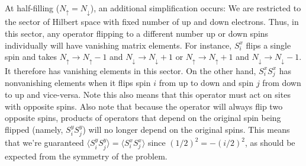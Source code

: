 \documentclass{report}
\begin{document}
At half-filling ($ N_\uparrow = N_\downarrow $), an additional 
simplification occurs: We are restricted to the sector of Hilbert space with 
fixed number of up and down electrons. Thus, in this sector, any operator
flipping to a different number up or down spins individually will have vanishing 
matrix elements. For instance, $ S_i^x $ flips a single spin and takes 
$ N_\uparrow \rightarrow N_\uparrow - 1 $ and $ N_\downarrow \rightarrow
N_\downarrow + 1 $ or $ N_\uparrow \rightarrow N_\uparrow + 1 $ and $
N_\downarrow \rightarrow N_\downarrow - 1 $. It therefore has vanishing elements 
in this sector. On the other hand, $ S_i^x S_j^x $ has nonvanishing elements 
when it flips spin $ i $ from up to down and spin $ j $ from down to up and 
vice-versa. Note this also means that this operator must act on sites with 
opposite spins. Also note that because the operator will always flip two opposite 
spins, products of operators that depend on the original spin being flipped 
(namely, $ S_i^y S_j^y $) will no longer depend on the original spins. 
This means that we're guaranteed $ \langle S_i^y S_j^y \rangle = 
\langle S_i^x S_j^x \rangle$ since $ (1/2)^2 = -(i/2)^2 $, as should be expected 
from the symmetry of the problem. 
\end{document}
